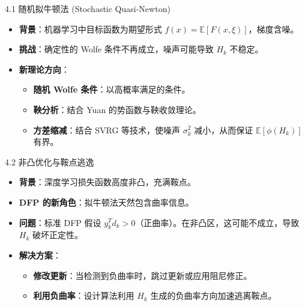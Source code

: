 \documentclass[11pt,hyperref={pdfpagelabels=false}]{beamer}
\begin{document}
\begin{frame}{4.1 随机拟牛顿法 (Stochastic Quasi-Newton)}
    \begin{itemize}
        \item \textbf{背景}：机器学习中目标函数为期望形式 $f(x) = \mathbb{E}[F(x, \xi)]$，梯度含噪。
        \item \textbf{挑战}：确定性的 Wolfe 条件不再成立，噪声可能导致 $H_k$ 不稳定。
        \item \textbf{新理论方向}：
        \begin{itemize}
            \item \textbf{随机 Wolfe 条件}：以高概率满足的条件。
            \item \textbf{鞅分析}：结合 Yuan 的势函数与鞅收敛理论。
            \item \textbf{方差缩减}：结合 SVRG 等技术，使噪声 $\sigma_k^2$ 减小，从而保证 $\mathbb{E}[\phi(H_k)]$ 有界。
        \end{itemize}
    \end{itemize}
\end{frame}

\begin{frame}{4.2 非凸优化与鞍点逃逸}
    \begin{itemize}
        \item \textbf{背景}：深度学习损失函数高度非凸，充满鞍点。
        \item \textbf{DFP 的新角色}：拟牛顿法天然包含曲率信息。
        \item \textbf{问题}：标准 DFP 假设 $y_k^T d_k > 0$（正曲率）。在非凸区，这可能不成立，导致 $H_k$ 破坏正定性。
        \item \textbf{解决方案}：
        \begin{itemize}
            \item \textbf{修改更新}：当检测到负曲率时，跳过更新或应用阻尼修正。
            \item \textbf{利用负曲率}：设计算法利用 $H_k$ 生成的负曲率方向加速逃离鞍点。
        \end{itemize}
    \end{itemize}
\end{frame}
\end{document}
